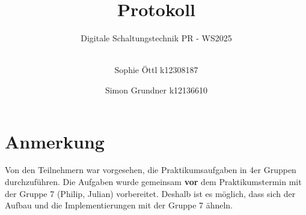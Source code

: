 \documentclass[
    ngerman,
    a4paper,
    oneside,
    10pt
]{scrartcl}
\begin{document}

\title{Protokoll}

\subtitle{Digitale Schaltungstechnik PR - WS2025\\%
	\hfill\\%
}

\author{%
    Sophie Öttl \authornewline
    k12308187 \and
	Simon Grundner \authornewline
    k12136610
	\authornewline
	\authornewline
	\authornewline
}

\maketitle


\lstset{
    language=c++,
    captionpos=t
}


\cleardoubleoddpage
\tableofcontents


\section*{Anmerkung}

Von den Teilnehmern war vorgesehen, die Praktikumsaufgaben in 4er Gruppen durchzuführen. Die Aufgaben wurde gemeinsam \textbf{vor} dem Praktikumstermin mit der Gruppe 7 (Philip, Julian) vorbereitet. Deshalb ist es möglich, dass sich der Aufbau und die Implementierungen mit der Gruppe 7 ähneln.









\end{document}
